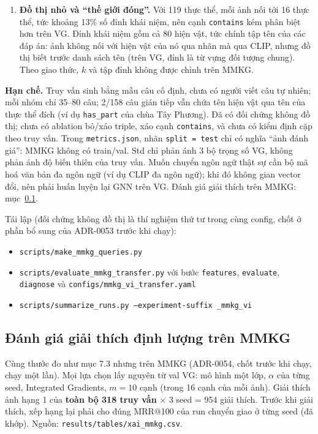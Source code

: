 \documentclass[12pt, a4paper]{article}
\makeatletter
\newcommand{\code}[1]{\texttt{#1}}
\newcommand{\mrr}{MRR@100}
\makeatother
\begin{document}
\begin{enumerate}[leftmargin=*]
\item \textbf{Đồ thị nhỏ và ``thế giới đóng''.} Với 119 thực thể, mỗi ảnh nối tới 16 thực thể, tức khoảng 13\% số đỉnh khái niệm, nên cạnh \code{contains} kém phân biệt hơn trên VG. Đỉnh khái niệm gồm cả 80 hiện vật, tức chính tập tên của các đáp án: ảnh không nối với hiện vật của nó qua nhãn mà qua CLIP, nhưng đồ thị biết trước danh sách tên (trên VG, đỉnh là từ vựng đối tượng chung). Theo giao thức, $k$ và tập đỉnh không được chỉnh trên MMKG.
\end{enumerate}

\textbf{Hạn chế.} Truy vấn sinh bằng mẫu câu cố định, chưa có người viết câu tự nhiên; mỗi nhóm chỉ 35--80 câu; 2/158 câu gián tiếp vẫn chứa tên hiện vật qua tên của thực thể đích (ví dụ \code{has\_part} của chùa Tây Phương). Đã có đối chứng không đồ thị; chưa có ablation bỏ/xáo triple, xáo cạnh \code{contains}, và chưa có kiểm định cặp theo truy vấn. Trong \code{metrics.json}, nhãn \code{split = test} chỉ có nghĩa ``ảnh đánh giá'': MMKG không có train/val. Std chỉ phản ánh 3 bộ trọng số VG, không phản ánh độ biến thiên của truy vấn. Muốn chuyển ngôn ngữ thật sự cần bộ mã hoá văn bản đa ngôn ngữ (ví dụ CLIP đa ngôn ngữ); khi đó không gian vector đổi, nên phải huấn luyện lại GNN trên VG. Đánh giá giải thích trên MMKG: mục~\ref{sec:mmkg-xai}.

Tái lập (đối chứng không đồ thị là thí nghiệm thứ tư trong cùng config, chốt ở phần bổ sung của ADR-0053 trước khi chạy):
\begin{itemize}[leftmargin=*]
\item \code{scripts/make\_mmkg\_queries.py}
\item \code{scripts/evaluate\_mmkg\_transfer.py} với bước \code{features}, \code{evaluate}, \code{diagnose} và \code{configs/mmkg\_vi\_transfer.yaml}
\item \code{scripts/summarize\_runs.py --experiment-suffix \_mmkg\_vi}
\end{itemize}

\subsection{Đánh giá giải thích định lượng trên MMKG}
\label{sec:mmkg-xai}
Cùng thước đo như mục 7.3 nhưng trên MMKG (ADR-0054, chốt trước khi chạy, chạy một lần). Mọi lựa chọn lấy nguyên từ val VG: mô hình một lớp, $\alpha$ của từng seed, Integrated Gradients, $m=10$ cạnh (trong 16 cạnh của mỗi ảnh). Giải thích ảnh hạng 1 của \textbf{toàn bộ 318 truy vấn} $\times$ 3 seed = 954 giải thích. Trước khi giải thích, xếp hạng lại phải cho đúng \mrr{} của run chuyển giao ở từng seed (đã khớp). Nguồn: \code{results/tables/xai\_mmkg.csv}.
\end{document}

